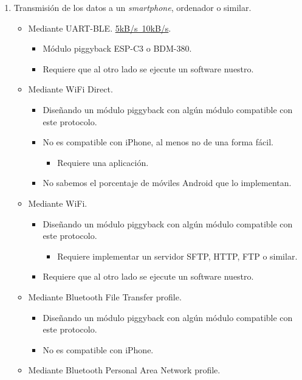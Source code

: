 \begin{enumerate}
   \item Transmisión de los datos a un \textit{smartphone}, ordenador o similar.
   \begin{itemize}
       \item Mediante UART-BLE. \href{https://stackoverflow.com/a/22919464}{5kB/s~10kB/s}.
       \begin{itemize}
           \item Módulo piggyback ESP-C3 o BDM-380.
           \item Requiere que al otro lado se ejecute un software nuestro.
       \end{itemize}
       \item Mediante WiFi Direct.
       \begin{itemize}
           \item Diseñando un módulo piggyback con algún módulo compatible con este protocolo.
           \item No es compatible con iPhone, al menos no de una forma fácil.
           \begin{itemize}
               \item Requiere una aplicación.
           \end{itemize}
           \item No sabemos el porcentaje de móviles Android que lo implementan.
       \end{itemize}
       \item Mediante WiFi.
       \begin{itemize}
           \item Diseñando un módulo piggyback con algún módulo compatible con este protocolo.
           \begin{itemize}
               \item Requiere implementar un servidor SFTP, HTTP, FTP o similar.
           \end{itemize}
           \item Requiere que al otro lado se ejecute un software nuestro.
       \end{itemize}
       \item Mediante Bluetooth File Transfer profile.
       \begin{itemize}
           \item Diseñando un módulo piggyback con algún módulo compatible con este protocolo.
           \item No es compatible con iPhone.
       \end{itemize}
       \item Mediante Bluetooth Personal Area Network profile.

\end{itemize}
\end{enumerate}
